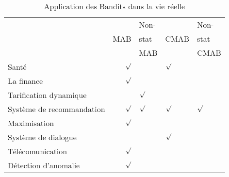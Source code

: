 \documentclass[conference]{IEEEtran}
\newcommand{\1}[1]{\mathbbm{1}_{\left\{#1\right\}}}
\begin{document}
\begin{table}[h]
\scriptsize
\caption {Application des Bandits dans la vie réelle}
\label{tab:Life} 
\begin{tabular}{|l|r|l|l|l|}
\hline
                            &     & Non-   &       & Non-   \\ 
                            & MAB     & stat  &  CMAB      &  stat  \\
                            &      & MAB    &       & CMAB  \\
                            \hline
Santé        &  $\surd$ &                      &  $\surd$  &                                  \\ \hline
La finance           &   $\surd$ &                     &           &                                  \\ \hline
Tarification dynamique  &         &     $\surd$           &           &                                  \\ \hline
Système de recommandation & $\surd$  &    $\surd$           & $\surd$   &     $\surd$                          \\ \hline
Maximisation      & $\surd$  &                      &           &                                  \\ \hline
Système de dialogue   &          &                      &   $\surd$  &                                  \\ \hline
Télécomunication  &  $\surd$ &                      &           &                                  \\ \hline
Détection d'anomalie          &   $\surd$ &                      &           &                                  \\ \hline
\end{tabular}
\end{table}
\end{document}
